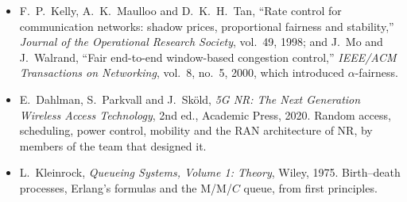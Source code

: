 \begin{itemize}
\item F.~P.~Kelly, A.~K.~Maulloo and D.~K.~H.~Tan, ``Rate control for communication networks: shadow prices, proportional fairness
and stability,'' \emph{Journal of the Operational Research Society}, vol.~49, 1998; and J.~Mo and J.~Walrand, ``Fair end-to-end
window-based congestion control,'' \emph{IEEE/ACM Transactions on Networking}, vol.~8, no.~5, 2000, which introduced
$\alpha$-fairness.
\item E.~Dahlman, S.~Parkvall and J.~Sk\"old, \emph{5G NR: The Next Generation Wireless Access Technology}, 2nd ed., Academic Press,
2020. Random access, scheduling, power control, mobility and the RAN architecture of NR, by members of the team that designed it.
\item L.~Kleinrock, \emph{Queueing Systems, Volume 1: Theory}, Wiley, 1975. Birth--death processes, Erlang's formulas and the
M/M/$C$ queue, from first principles.
\end{itemize}

